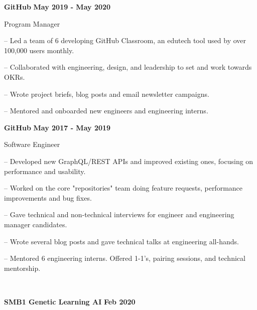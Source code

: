 \documentclass[12pt]{extarticle}
\begin{document}
{    \vspace{0.3cm}
    {\indent
        \textbf{GitHub} \hfill \textbf{May 2019 - May 2020}

        Program Manager

        \begin{compactitem}
            \setlength{\itemindent}{0.5cm}
            \item[--] Led a team of 6 developing GitHub Classroom, an edutech tool used by over 100,000 users monthly.
            \item[--] Collaborated with engineering, design, and leadership to set and work towards OKRs.
            \item[--] Wrote project briefs, blog posts and email newsletter campaigns.
            \item[--] Mentored and onboarded new engineers and engineering interns.
        \end{compactitem}
    }

    \vspace{0.3cm}

    {\indent
        \textbf{GitHub} \hfill \textbf{May 2017 - May 2019}

        Software Engineer

        \begin{compactitem}
            \setlength{\itemindent}{0.5cm}
            \item[--] Developed new GraphQL/REST APIs and improved existing ones, focusing on performance and usability.
            \item[--] Worked on the core "repositories" team doing feature requests, performance improvements and bug fixes.
            \item[--] Gave technical and non-technical interviews for engineer and engineering manager candidates.
            \item[--] Wrote several blog posts and gave technical talks at engineering all-hands.
            \item[--] Mentored 6 engineering interns. Offered 1-1's, pairing sessions, and technical mentorship.
        \end{compactitem}
    }

    \vspace{1cm}
    \\

    \vspace{-0.2cm}
    {\indent
        \textbf{SMB1 Genetic Learning AI} \hfill \textbf{Feb 2020}

}}
\end{document}
